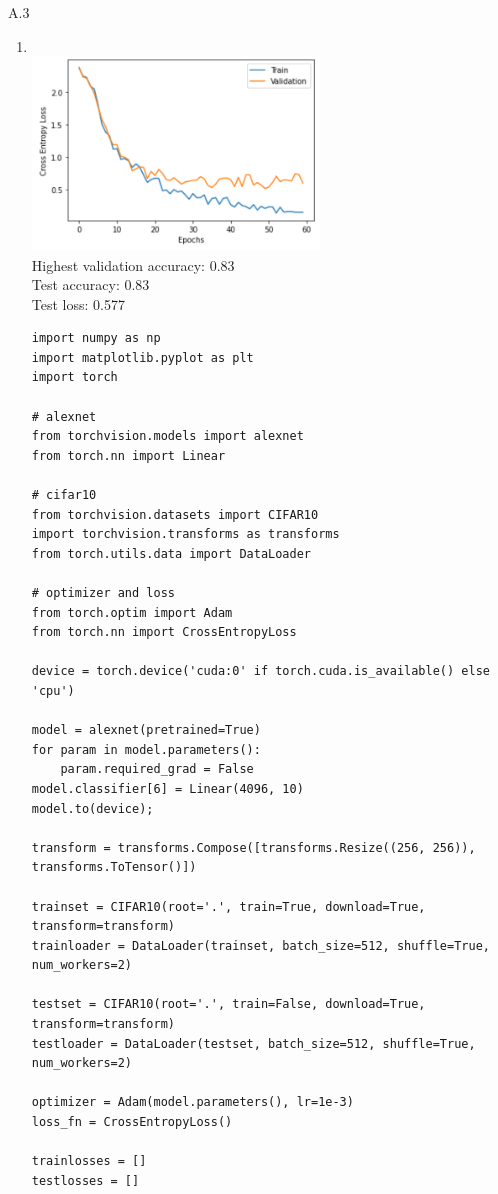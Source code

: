 \documentclass{article}
\begin{document}
A.3
\begin{enumerate}
        \item \, \\
        \includegraphics[width=0.6\textwidth]{code/A3a.png} \\
        Highest validation accuracy: 0.83 \\
        Test accuracy: 0.83 \\
        Test loss: 0.577
        \begin{verbatim}
import numpy as np
import matplotlib.pyplot as plt
import torch

# alexnet
from torchvision.models import alexnet
from torch.nn import Linear

# cifar10
from torchvision.datasets import CIFAR10
import torchvision.transforms as transforms
from torch.utils.data import DataLoader

# optimizer and loss
from torch.optim import Adam
from torch.nn import CrossEntropyLoss

device = torch.device('cuda:0' if torch.cuda.is_available() else 'cpu')

model = alexnet(pretrained=True)
for param in model.parameters():
    param.required_grad = False
model.classifier[6] = Linear(4096, 10)
model.to(device);

transform = transforms.Compose([transforms.Resize((256, 256)), transforms.ToTensor()])

trainset = CIFAR10(root='.', train=True, download=True, transform=transform)
trainloader = DataLoader(trainset, batch_size=512, shuffle=True, num_workers=2)

testset = CIFAR10(root='.', train=False, download=True, transform=transform)
testloader = DataLoader(testset, batch_size=512, shuffle=True, num_workers=2)

optimizer = Adam(model.parameters(), lr=1e-3)
loss_fn = CrossEntropyLoss()

trainlosses = []
testlosses = []


\end{verbatim}
\end{enumerate}
\end{document}

